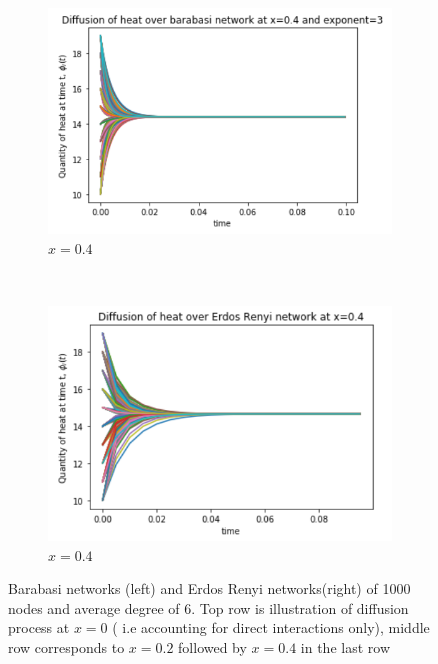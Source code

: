 \documentclass[10pt,a4paper]{article}
\begin{document}
\begin{figure}[!h]
\begin{subfigure}[b]{0.45\textwidth}
		\includegraphics[width= \textwidth]{images/barabasi-x04.png}
		\caption{$x=0.4$}
		\label{barabasi-x04}
	\end{subfigure}~
	\begin{subfigure}[b]{0.45\textwidth}
		\includegraphics[width= \textwidth]{images/erdos-x04.png}
		\caption{$x=0.4$}
		\label{erdos-x04}
	\end{subfigure}
	\caption{Barabasi networks (left) and Erdos Renyi networks(right) of 1000 nodes and average degree of 6. Top row is illustration of diffusion process at $x=0$ ( i.e accounting for direct interactions only), middle row corresponds to $x=0.2$ followed by $x=0.4$ in the last row}
	\label{barabasi-Erdos-compare}
\end{figure}
\end{document}
